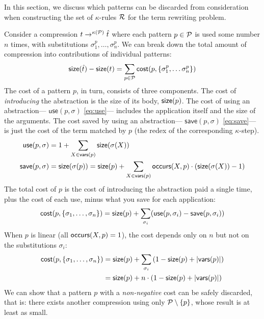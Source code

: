In this section, we discuss which patterns can be discarded from consideration
when constructing the set of $\kappa$-rules $\mathcal{R}$ for the term rewriting problem.


%
Consider a compression $t \rightarrow^{\kappa(\mathcal{P})} \hat{t}$
where each pattern $p \in \mathcal{P}$ is used some number $n$ times, 
with substitutions $\sigma^p_1, \ldots, \sigma^p_n$.
%
We can break down the total amount of compression into contributions of individual patterns:
\[
  \mathsf{size}(\hat{t}) - \mathsf{size}(t) = \sum_{p \in \mathcal{P}} \mathsf{cost}(p, \{\sigma^p_1, \dots \sigma^p_n\})
\]
%
The cost of a pattern $p$, in turn, consists of three components.
%
The cost of \emph{introducing} the abstraction is the size of its body, \ie $\mathsf{size}(p)$.
%
The cost of using an abstraction---%
$\textsf{use}(p, \sigma)$ \eqref{eq:use}---%
 includes the application itself and the size of the arguments.
The cost saved by using an abstraction---%
$\textsf{save}(p, \sigma)$ \eqref{eq:save}---%
 is just the cost of the term matched by $p$
 (\ie the redex of the corresponding $\kappa$-step).
%
\begin{align}
  \textsf{use}(p, \sigma) &= 1 + \sum_{X \in \mathsf{vars}(p)} \mathsf{size}(\sigma(X)) \label{eq:use} \\
  \textsf{save}(p, \sigma) &= \mathsf{size}({\sigma}({p})) = 
  \mathsf{size}(p) + \sum_{X \in \mathsf{vars}(p)} \mathsf{occurs}(X, p) \cdot (\mathsf{size}(\sigma(X)) - 1)\label{eq:save}
\end{align}
%
The total cost of $p$ is 
 the cost of introducing the abstraction paid a single time,
 plus the cost of each use, minus what you save for each application:
\begin{equation}
  \textsf{cost}(p, \{\sigma_1,\ldots,\sigma_n\}) 
  = \mathsf{size}(p) + \sum_{\sigma_i} (\textsf{use}(p, \sigma_i) - \textsf{save}(p, \sigma_i))
\end{equation}
%
When $p$ is linear (all $\mathsf{occurs}(X, p) = 1$), 
 the cost depends only on $n$ but not on the substitutions $\sigma_i$:
\begin{align}
  \textsf{cost}(p, \{\sigma_1,\ldots,\sigma_n\}) 
  &= \mathsf{size}(p) + \sum_{\sigma_i} \left(
    1 - \mathsf{size}(p) + |\mathsf{vars}(p)|
  \right) \\
  &= \mathsf{size}(p) + n \cdot \left(
    1 - \mathsf{size}(p) + |\mathsf{vars}(p)|
  \right)
\end{align}
%
We can show that a pattern $p$ with a \emph{non-negative} cost can be safely discarded,
that is: there exists another compression using only $\mathcal{P} \setminus \{p\}$,
whose result is at least as small.

